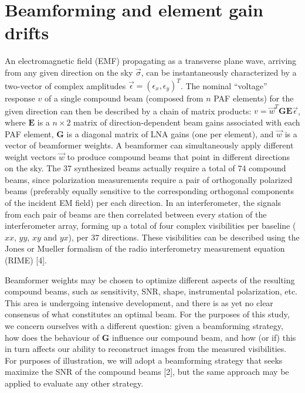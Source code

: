 \documentclass{aps2010} \special{papersize=8.5in,11in}
\begin{document}
\section{Beamforming and element gain drifts}

\noindent An electromagnetic field (EMF) propagating as a transverse plane wave, arriving from any given direction on the sky $\vec\sigma$, can be 
instantaneously characterized by a two-vector of complex amplitudes $\vec \epsilon = (\epsilon_x,\epsilon_y)^T$. The nominal ``voltage'' response $v$ of a single compound beam (composed from $n$ PAF elements) for the given direction can then be described by a chain of matrix products: $v=\vec w^T \mathbf{G} \mathbf{E} \vec\epsilon$, where $\mathbf{E}$ is a $n\times2$ matrix of direction-dependent beam gains associated with each PAF element, $\mathbf{G}$ is a diagonal matrix of LNA gains (one per element), and $\vec w$ is a vector of beamformer weights. A beamformer can simultaneously apply different weight vectors $\vec w$ to produce compound beams that point in different directions on the sky. The 37 synthesized beams actually require a total of 74 compound beams, since polarization measurements require a pair of orthogonally polarized beams (preferably equally sensitive to the corresponding orthogonal components of the incident EM field) per each direction. In an interferometer, the signals from each pair of beams are then correlated between every station of the interferometer array, forming up a total of four complex visibilities per baseline ($xx$, $yy$, $xy$ and $yx$), per 37 directions. These visibilities can be described using the Jones or Mueller formalism of the radio interferometry measurement equation (RIME) [4].

Beamformer weights may be chosen to optimize different aspects of the resulting compound beams, such as sensitivity, SNR, shape, instrumental polarization, etc. This area is undergoing intensive development, and there is as yet no clear consensus of what constitutes an optimal beam. For the purposes of this study, we concern ourselves with a different question: given a beamforming strategy, how does the behaviour of $\mathbf{G}$ influence our compound beam, and how (or if) this in turn affects our ability to reconstruct images from the measured visibilities. For purposes of illustration, we will adopt a beamforming strategy that seeks maximize the SNR of the compound beams [2], but the same approach may be applied to evaluate any other strategy.
\end{document}
